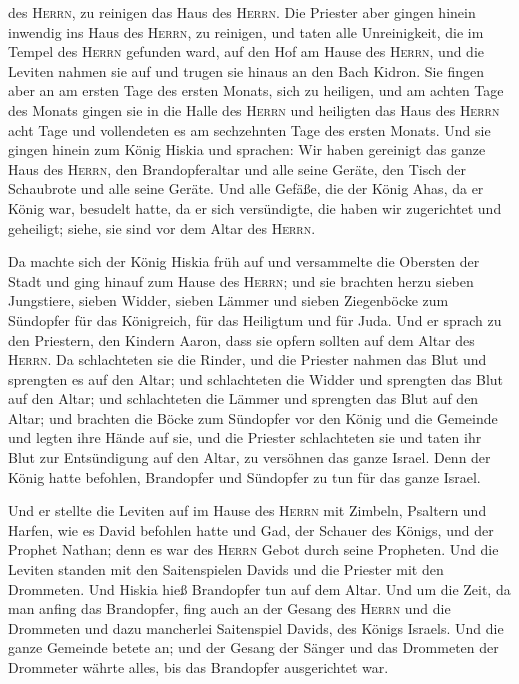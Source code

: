 des \textsc{Herrn}, zu reinigen das Haus des \textsc{Herrn}.
 Die Priester aber gingen hinein inwendig ins Haus des
\textsc{Herrn}, zu reinigen, und taten alle Unreinigkeit, die im Tempel
des \textsc{Herrn} gefunden ward, auf den Hof am Hause des
\textsc{Herrn}, und die Leviten nahmen sie auf und trugen sie hinaus an
den Bach Kidron.  Sie fingen aber an am ersten Tage des
ersten Monats, sich zu heiligen, und am achten Tage des Monats gingen
sie in die Halle des \textsc{Herrn} und heiligten das Haus des
\textsc{Herrn} acht Tage und vollendeten es am sechzehnten Tage des
ersten Monats.  Und sie gingen hinein zum König Hiskia
und sprachen: Wir haben gereinigt das ganze Haus des \textsc{Herrn}, den
Brandopferaltar und alle seine Geräte, den Tisch der Schaubrote und alle
seine Geräte.  Und alle Gefäße, die der König Ahas, da er
König war, besudelt hatte, da er sich versündigte, die haben wir
zugerichtet und geheiligt; siehe, sie sind vor dem Altar des
\textsc{Herrn}.

 Da machte sich der König Hiskia früh auf und versammelte
die Obersten der Stadt und ging hinauf zum Hause des \textsc{Herrn};
 und sie brachten herzu sieben Jungstiere, sieben Widder,
sieben Lämmer und sieben Ziegenböcke zum Sündopfer für das Königreich,
für das Heiligtum und für Juda. Und er sprach zu den Priestern, den
Kindern Aaron, dass sie opfern sollten auf dem Altar des \textsc{Herrn}.
 Da schlachteten sie die Rinder, und die Priester nahmen
das Blut und sprengten es auf den Altar; und schlachteten die Widder und
sprengten das Blut auf den Altar; und schlachteten die Lämmer und
sprengten das Blut auf den Altar;  und brachten die Böcke
zum Sündopfer vor den König und die Gemeinde und legten ihre Hände auf
sie,  und die Priester schlachteten sie und taten ihr
Blut zur Entsündigung auf den Altar, zu versöhnen das ganze Israel. Denn
der König hatte befohlen, Brandopfer und Sündopfer zu tun für das ganze
Israel.

 Und er stellte die Leviten auf im Hause des
\textsc{Herrn} mit Zimbeln, Psaltern und Harfen, wie es David befohlen
hatte und Gad, der Schauer des Königs, und der Prophet Nathan; denn es
war des \textsc{Herrn} Gebot durch seine Propheten.  Und
die Leviten standen mit den Saitenspielen Davids und die Priester mit
den Drommeten.  Und Hiskia hieß Brandopfer tun auf dem
Altar. Und um die Zeit, da man anfing das Brandopfer, fing auch an der
Gesang des \textsc{Herrn} und die Drommeten und dazu mancherlei
Saitenspiel Davids, des Königs Israels.  Und die ganze
Gemeinde betete an; und der Gesang der Sänger und das Drommeten der
Drommeter währte alles, bis das Brandopfer ausgerichtet war.

